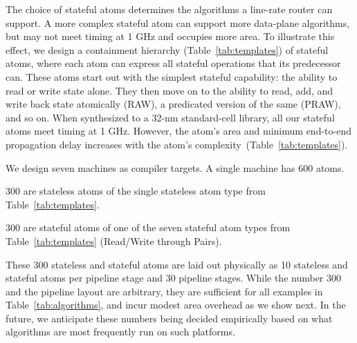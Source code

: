 The choice of stateful atoms determines the algorithms a line-rate router can
support. A more complex stateful atom can support more data-plane algorithms,
but may not meet timing at 1 GHz and occupies more area. To illustrate this
effect, we design a containment hierarchy (Table~\ref{tab:templates}) of
stateful atoms, where each atom can express all stateful operations that its
predecessor can.  These atoms start out with the simplest stateful capability:
the ability to read or write state alone.  They then move on to the ability to
read, add, and write back state atomically (RAW), a predicated version of the
same (PRAW), and so on. When synthesized to a 32-nm standard-cell library, all
our stateful atoms meet timing at 1 GHz.  However, the atom's area and minimum
end-to-end propagation delay increases with the atom's
complexity~(Table~\ref{tab:templates}).

We design seven \absmachine machines as compiler targets. A single \absmachine
machine has 600 atoms.
\begin{CompactEnumerate}
\item 300 are stateless atoms of the single stateless atom type from
Table~\ref{tab:templates}.
\item 300 are stateful atoms of one of the seven stateful atom types from
Table~\ref{tab:templates} (Read/Write through Pairs).
\end{CompactEnumerate}
These 300 stateless and stateful atoms are laid out physically as 10 stateless
and stateful atoms per pipeline stage and 30 pipeline stages. While the number
300 and the pipeline layout are arbitrary, they are sufficient for all examples
in Table~\ref{tab:algorithms}, and incur modest area overhead as we show next. In
the future, we anticipate these numbers being decided empirically based on what
algorithms are most frequently run on such platforms.

